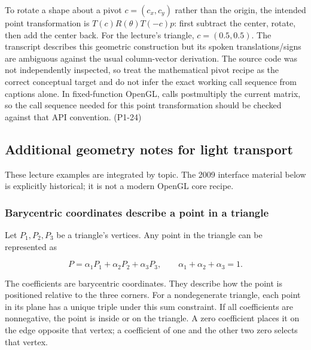 To rotate a shape about a pivot \(c=(c_x,c_y)\) rather than the origin, the intended point transformation is \(T(c)R(\theta)T(-c)p\): first subtract the center, rotate, then add the center back. For the lecture's triangle, \(c=(0.5,0.5)\). The transcript describes this geometric construction but its spoken translations/signs are ambiguous against the usual column-vector derivation. The source code was not independently inspected, so treat the mathematical pivot recipe as the correct conceptual target and do not infer the exact working call sequence from captions alone. In fixed-function OpenGL, calls postmultiply the current matrix, so the call sequence needed for this point transformation should be checked against that API convention. (P1-24)

\subsection{Additional geometry notes for light transport}\label{03-visual-computing-i-ch018-additional-geometry-notes-for-light-transport}

\hypertarget{03-visual-computing-i-ch018-additional-geometry-notes-for-light-transport}{}

These lecture examples are integrated by topic. The 2009 interface material below is explicitly historical; it is not a modern OpenGL core recipe.

\subsubsection{Barycentric coordinates describe a point in a triangle}\label{03-visual-computing-i-ch018-barycentric-coordinates-describe-a-point-in-a-triangle}

\hypertarget{03-visual-computing-i-ch018-barycentric-coordinates-describe-a-point-in-a-triangle}{}

Let \(P_1,P_2,P_3\) be a triangle's vertices. Any point in the triangle can be represented as

\[
P=\alpha_1P_1+\alpha_2P_2+\alpha_3P_3,
\qquad \alpha_1+\alpha_2+\alpha_3=1.
\]

The coefficients are barycentric coordinates. They describe how the point is positioned relative to the three corners. For a nondegenerate triangle, each point in its plane has a unique triple under this sum constraint. If all coefficients are nonnegative, the point is inside or on the triangle. A zero coefficient places it on the edge opposite that vertex; a coefficient of one and the other two zero selects that vertex.


